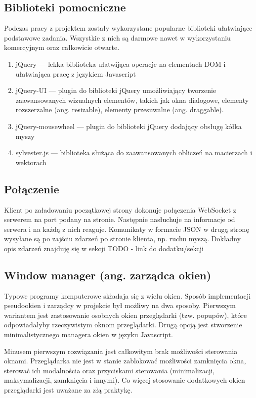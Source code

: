 \subsection{Biblioteki pomocniczne}
Podczas pracy z projektem zostały wykorzystane popularne biblioteki ułatwiające podstawowe zadania. Wszystkie z nich są darmowe nawet w wykorzystaniu komercyjnym oraz całkowicie otwarte.
\begin{enumerate}
  \item jQuery --- lekka biblioteka ułatwijąca operacje na elementach DOM i ułatwiająca pracę z językiem Javascript
  \item jQuery-UI --- plugin do biblioteki jQuery umożliwiający tworzenie zaawansowanych wizualnych elementów, takich jak okna dialogowe, elementy rozszerzalne (ang. resizable), elementy przesuwalne (ang. draggable).
  \item jQuery-mousewheel --- plugin do biblioteki jQuery dodający obsługę kółka myszy
  \item sylvester.js --- biblioteka służąca do zaawansowanych obliczeń na macierzach i wektorach
\end{enumerate}


\subsection{Połączenie}
Klient po załadowaniu początkowej strony dokonuje połączenia WebSocket z serwerem na port podany na stronie. Następnie nasłuchuje na informacje od serwera i na każdą z nich reaguje. Komunikaty w formacie JSON w drugą stronę wysyłane są po zajściu zdarzeń po stronie klienta, np. ruchu myszą. Dokładny opis zdarzeń znajduję się w sekcji TODO - link do dodatku/sekcji

\subsection{Window manager (ang. zarządca okien)}
Typowe programy komputerowe składaja się z wielu okien. Sposób implementacji pseudookien i zarządcy w projekcie był możliwy na dwa sposoby.
Pierwszym wariantem jest zastosowanie osobnych okien przeglądarki (tzw. popupów), które odpowiadałyby rzeczywistym oknom przeglądarki.
Drugą opcją jest stworzenie minimalistycznego managera okien w języku Javascript.

Minusem pierwszym rozwiązania jest całkowitym brak możliwości sterowania oknami. Przeglądarka nie jest w stanie zablokować możliwości zamknięcia okna, sterować ich modalnościa oraz przyciskami sterowania (minimalizacji, maksymalizacji, zamknięcia i innymi). Co więcej stosowanie dodatkowych okien przeglądarki jest uważane za złą praktykę.

